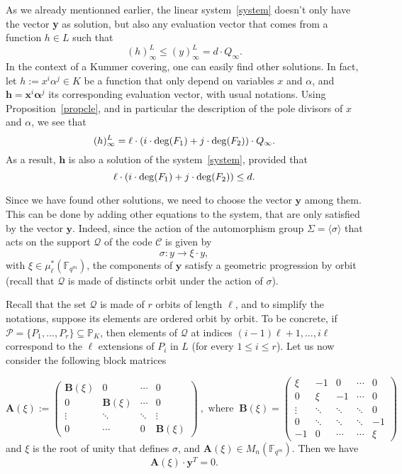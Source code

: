 \documentclass[10pt]{article}
\theoremstyle{definition}
\theoremstyle{definition}
\theoremstyle{definition}
\newcommand{\s}{\vspace{0.3cm}}
\newcommand{\cd}{\cdot}
\newcommand{\PP}{\mathbb{P}}
\newcommand{\fqm}{\mathbb{F}_{q^m}}
\newcommand{\su}{\subseteq}
\newcommand{\PR}{\mathcal{P}}
\newcommand{\QR}{\mathcal{Q}}
\begin{document}
As we already mentionned earlier, the linear system~\eqref{system} doesn't only have the vector \textbf{y} as solution, but also any evaluation vector that comes from a function $h \in L$ such that 
\[(h)^L_{\infty} \leq (y)^L_{\infty} = d \cd Q_{\infty}.\]
In the context of a Kummer covering, one can easily find other solutions. In fact, let $h := x^i\alpha^j \in K$ be a function that only depend on variables $x$ and $\alpha$, and $\mathbf{h} = \textbf{x}^i\boldsymbol{\alpha}^j$ its corresponding evaluation vector, with usual notations. Using Proposition~\ref{propcle}, and in particular the description of the pole divisors of $x$ and $\alpha$, we see that 
\[ (h)^L_{\infty} = \ell \cd \left(i \cd \deg(F_1)+j \cd \deg(F_{\rm 2})\right) \cd Q_{\infty}.\]
As a result, $\mathbf{h}$ is also a solution of the system~\eqref{system}, provided that
\[\ell \cd \left(i \cd \deg(F_1)+j \cd \deg(F_{\rm 2})\right) \leq d.\]


\s

Since we have found other solutions, we need to choose the vector $\mathbf{y}$ among them. This can be done by adding other equations to the system, that are only satisfied by the vector $\mathbf{y}$. Indeed, since the action of the automorphism group $\Sigma = \langle\sigma\rangle$ that acts on the support $\QR$ of the code $\mathcal{C}$ is given by 
\[\sigma : y \longrightarrow \xi \cd y,\]
with $\xi \in \mu^*_{\ell}(\fqm)$, the components of $\mathbf{y}$ satisfy a geometric progression by orbit (recall that $\QR$ is made of distincts orbit under the action of $\sigma$).

 Recall that the set $\QR$ is made of $r$ orbits of length $\ell$, and to simplify the notations, suppose its elements are ordered orbit by orbit. To be concrete, if $\PR = \{P_1,...,P_r\} \su \PP_K$, then elements of $\QR$ at indices $(i-1)\ell+1,...,i\ell$ correspond to the $\ell$ extensions of $P_{i}$ in $L$ (for every $1\leq i \leq r$). Let us now consider the following block matrices

\begin{equation*} 
\mathbf{A}(\xi) := 
\begin{pmatrix}
\mathbf{B}(\xi) & 0 & \cdots & 0 \\
0 & \mathbf{B}(\xi) & \cdots & 0 \\
\vdots & \ddots & \ddots & \vdots \\
0 & \cdots & 0 & \mathbf{B}(\xi)
\end{pmatrix} \ , \textrm{ where }\ 
\mathbf{B}(\xi) = 
\begin{pmatrix}
\xi & -1 & 0 & \cdots & 0 \\
0 & \xi & -1 & \cdots & 0 \\
\vdots & \ddots & \ddots & \ddots & 0 \\
0 & \ddots & \ddots & \ddots & -1 \\
-1 & 0 & \cdots & \cdots & \xi
\end{pmatrix}
\end{equation*}
and $\xi$ is the root of unity that defines $\sigma$, and $\mathbf{A}(\xi) \in M_{n}(\fqm)$. Then we have
\begin{equation*}
\mathbf{A}(\xi) \cd \textbf{y}^T
= 0.
\end{equation*}
\end{document}
